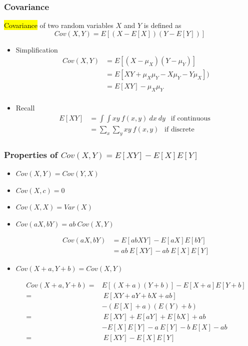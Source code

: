 \documentclass[slidestop,compress,mathserif]{beamer}
\begin{document}
\begin{frame}\frametitle{Covariance}
\begin{defn}
\hl{Covariance} of two random variables $X$ and $Y$ is defined as
\[ Cov(X,Y) = E[ (X-E[X]) (Y-E[Y]) ] \]
\end{defn}
\begin{itemize}
\item Simplification
\begin{align*}
    Cov(X,Y)  &= E[ (X-\mu_X) (Y-\mu_Y) ]\\
             &= E[ XY+\mu_X\mu_Y-X\mu_Y-Y\mu_X]) \\
             &= E[XY]-\mu_X\mu_Y \\
\end{align*}
\vspace{-0.7cm}
\item Recall
\begin{align*}
    E[XY]  &= \int\int xy ~f(x, y) ~dx~dy ~~ \text{ if continuous }\\
             &= \sum_x \sum_y xy~ f(x, y)~~ \text{ if discrete }
\end{align*}
\end{itemize}

\end{frame}


\begin{frame}\frametitle{Properties of $Cov(X,Y) = E[XY]- E[X]E[Y]$}
\begin{itemize}
\item $Cov(X,Y) = Cov(Y, X)$

\item $Cov(X,c) = 0$

\item $Cov(X,X) = Var(X)$

\item $Cov(aX,bY) = ab~Cov(X,Y)$

\vspace{-0.5cm}
\begin{align*}
Cov(aX,bY) & = E[abXY] - E[aX]E[bY] \\
	& = ab~E[XY] - ab~E[X]E[Y]
\end{align*}



\item
$Cov(X+a,Y+b) = Cov(X,Y)$

\vspace{-0.5cm}
\begin{align*}
Cov(X + a,Y+b) = & E[(X+a)(Y+b)] - E[X+a]E[Y+b] \\
	= & ~E[XY + aY + bX + ab] \\
	& - (E[X] + a) (E(Y)+b)\\
	= & ~E[XY] + E[aY] + E[bX] + ab \\
	& - E[X]E[Y] - a~E[Y] -b~E[X] - ab \\
	= & ~E[XY]- E[X]E[Y]
\end{align*}

\end{itemize}

\end{frame}
\end{document}
